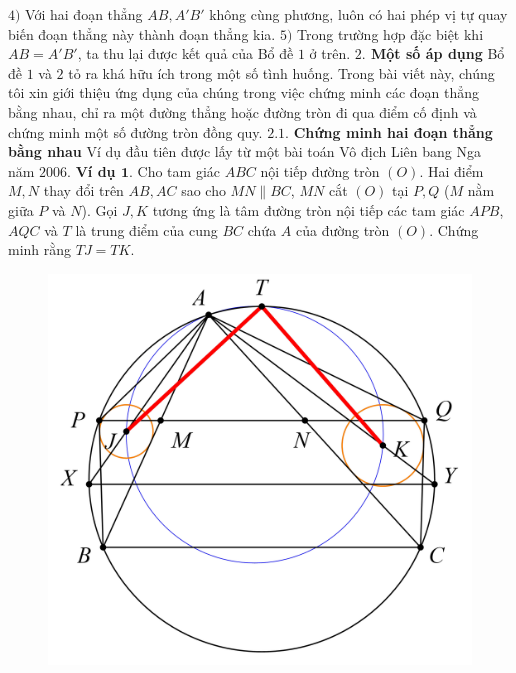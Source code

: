 \begin{multicols}{2}
\begin{figure}[H]
		\vspace*{-10pt}
	\end{figure}
	$4)$ Với hai đoạn thẳng $AB,A'B'$ không cùng phương, luôn có hai phép vị tự quay biến đoạn thẳng này thành đoạn thẳng kia.
	\vskip 0.1cm
	$5)$ Trong trường hợp đặc biệt khi $AB=A'B'$, ta thu lại được kết quả của Bổ đề $1$ ở trên.
	\vskip 0.1cm
	\textbf{\color{diendantoanhoc}$2.$  Một số áp dụng}
	\vskip 0.1cm
	Bổ đề $1$ và $2$ tỏ ra khá hữu ích trong một số tình huống. Trong bài viết này, chúng tôi xin giới thiệu ứng dụng của chúng trong việc chứng minh các đoạn thẳng bằng nhau, chỉ ra một đường thẳng hoặc đường tròn đi qua điểm cố định và chứng minh một số đường tròn đồng quy.
	\vskip 0.1cm
	$\pmb{2.1.}$ \textbf{\color{diendantoanhoc}Chứng minh hai đoạn thẳng bằng nhau}
	\vskip 0.1cm
	Ví dụ đầu tiên được lấy từ một bài toán Vô địch Liên bang Nga năm $2006$.
	\vskip 0.1cm
	\textbf{\color{diendantoanhoc}Ví dụ $\pmb{1.}$} Cho tam giác $ABC$ nội tiếp đường tròn $(O)$. Hai điểm $M,N$ thay đổi trên $AB,AC$ sao cho $MN \parallel BC$, $MN$ cắt $(O)$ tại  $P,Q$ ($M$ nằm giữa $P$ và $N$). Gọi $J,K$ tương ứng là tâm đường tròn nội tiếp các tam giác $APB$, $AQC$ và $T$ là trung điểm của cung $BC$ chứa $A$ của đường tròn $(O)$. Chứng minh rằng $TJ=TK$.
	\begin{figure}[H]
		\vspace*{-5pt}
		\centering
		\captionsetup{labelformat= empty, justification=centering}
		\includegraphics[width= 0.9\linewidth]{4}
		\vspace*{-10pt}
	\end{figure}

\end{multicols}
